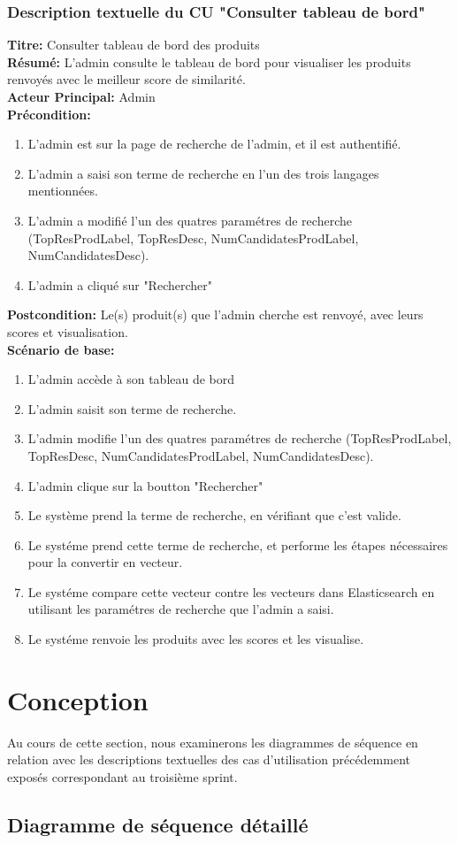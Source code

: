 \subsubsection{Description textuelle du CU "Consulter tableau de bord"}
\noindent
\textbf{Titre:} Consulter tableau de bord des produits \\
\textbf{Résumé:} L'admin consulte le tableau de bord pour visualiser les produits renvoyés avec le meilleur score de similarité. \\
\textbf{Acteur Principal:} Admin \\
\textbf{Précondition:} \begin{enumerate}
	\item L'admin est sur la page de recherche de l'admin, et il est authentifié.
	\item L'admin a saisi son terme de recherche en l'un des trois langages mentionnées.
	\item L'admin a modifié l'un des quatres paramétres de recherche (TopResProdLabel, TopResDesc, NumCandidatesProdLabel, NumCandidatesDesc).
	\item L'admin a cliqué sur "Rechercher"
\end{enumerate}
\textbf{Postcondition:} Le(s) produit(s) que l'admin cherche est renvoyé, avec leurs scores et visualisation. \\
\textbf{Scénario de base: }
\begin{enumerate}
	\item L'admin accède à son tableau de bord
	\item L'admin saisit son terme de recherche.
	\item L'admin modifie l'un des quatres paramétres de recherche (TopResProdLabel, TopResDesc, NumCandidatesProdLabel, NumCandidatesDesc).
	\item L'admin clique sur la boutton "Rechercher"
	\item Le système prend la terme de recherche, en vérifiant que c'est valide.
	\item Le systéme prend cette terme de recherche, et performe les étapes nécessaires pour la convertir en vecteur.
	\item Le systéme compare cette vecteur contre les vecteurs dans Elasticsearch en utilisant les paramétres de recherche que l'admin a saisi.
	\item Le systéme renvoie les produits avec les scores et les visualise.
\end{enumerate}

\newpage
\section{Conception}
\noindent
Au cours de cette section, nous examinerons les diagrammes de séquence en relation avec les descriptions textuelles des cas d'utilisation précédemment exposés correspondant au troisième sprint.

\subsection{Diagramme de séquence détaillé}